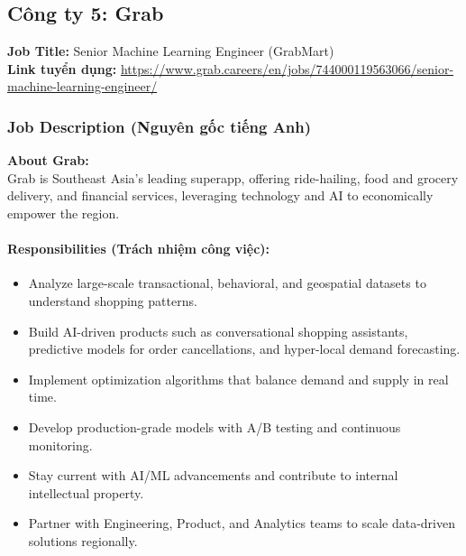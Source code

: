 \subsection{Công ty 5: Grab}

\noindent\textbf{Job Title:} Senior Machine Learning Engineer (GrabMart) \\
\textbf{Link tuyển dụng:} \url{https://www.grab.careers/en/jobs/744000119563066/senior-machine-learning-engineer/}

\subsubsection*{Job Description (Nguyên gốc tiếng Anh)}

\textbf{About Grab:} \\
\indent Grab is Southeast Asia's leading superapp, offering ride-hailing, food and grocery delivery, and financial services, leveraging technology and AI to economically empower the region.

\paragraph{Responsibilities (Trách nhiệm công việc):}
\begin{itemize}
    \item Analyze large-scale transactional, behavioral, and geospatial datasets to understand shopping patterns.
    \item Build AI-driven products such as conversational shopping assistants, predictive models for order cancellations, and hyper-local demand forecasting.
    \item Implement optimization algorithms that balance demand and supply in real time.
    \item Develop production-grade models with A/B testing and continuous monitoring.
    \item Stay current with AI/ML advancements and contribute to internal intellectual property.
    \item Partner with Engineering, Product, and Analytics teams to scale data-driven solutions regionally.
\end{itemize}

